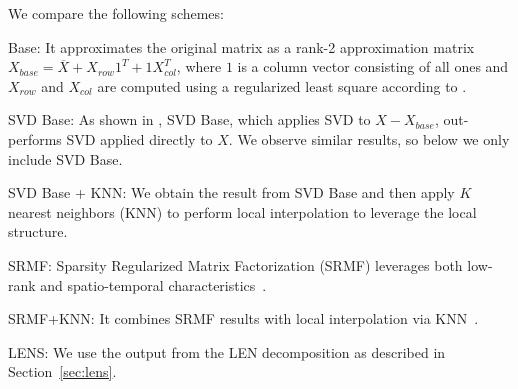  We compare the following schemes:
\begin{sitemize}
\item Base: It approximates the original matrix as a rank-2 approximation matrix
$X_{base} = \overline{X} + X_{row} 1^{T} + 1X_{col}^{T}$, where $1$ is a column
vector consisting of all ones and $X_{row}$ and $X_{col}$ are computed
using a regularized least square according to \cite{zhang09sensing}.
\item SVD Base: As shown in \cite{zhang09sensing}, SVD Base, which applies
  SVD to $X-X_{base}$, out-performs SVD applied directly to $X$.
  We observe similar results, so below we only include SVD
  Base.
\item SVD Base + KNN: We obtain the result from SVD Base and then
  apply $K$ nearest neighbors (KNN) to perform local interpolation 
  to leverage the local structure. 
\item SRMF: Sparsity Regularized Matrix Factorization (SRMF) 
  leverages both low-rank and spatio-temporal characteristics~\cite{zhang09sensing}.
\item SRMF+KNN: It combines SRMF results with local interpolation via
  KNN~\cite{zhang09sensing}. 
\item LENS: We use the output from the LEN decomposition as described
  in Section~\ref{sec:lens}.
\end{sitemize}

